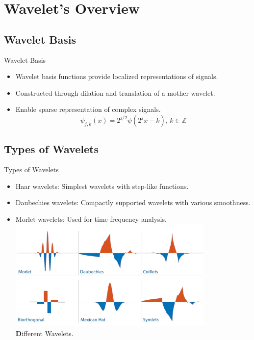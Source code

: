 \documentclass{beamer}
\begin{document}
\section{Wavelet's Overview}
\subsection{Wavelet Basis}
\begin{frame}{Wavelet Basis}
    \begin{itemize}
        \item Wavelet basis functions provide localized representations of signals.
        \item Constructed through dilation and translation of a mother wavelet.
        \item Enable sparse representation of complex signals.
        \[
             \psi_{j,k}(x) = 2^{j/2} \psi(2^j x - k), \, k \in \mathbb{Z}
        \]
    \end{itemize}
\end{frame}

\subsection{Types of Wavelets}
\begin{frame}{Types of Wavelets}
    \begin{itemize}
        \item Haar wavelets: Simplest wavelets with step-like functions.
        \item Daubechies wavelets: Compactly supported wavelets with various smoothness.
        \item Morlet wavelets: Used for time-frequency analysis.
        \vfill %
        \centering
        \includegraphics[width=0.8\textwidth]{wavelet.png} %
        \\[0.2cm] %
        {\small \textbf Different Wavelets.} %
        
    \end{itemize}
\end{frame}
\end{document}
